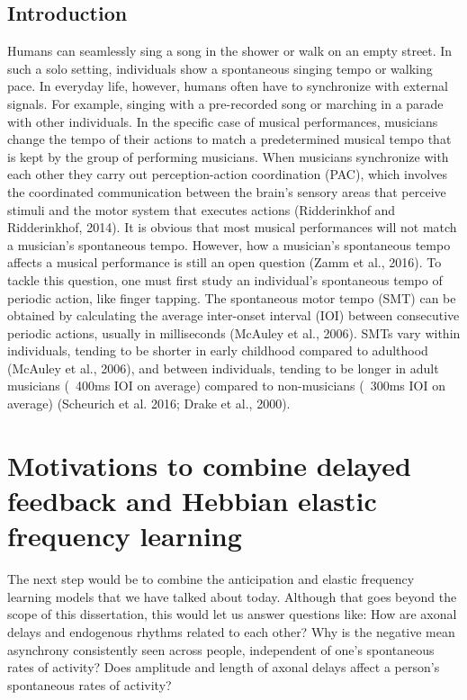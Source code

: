 \documentclass{report}
\begin{document}
\section{Introduction}
Humans can seamlessly sing a song in the shower or walk on an empty street. In such a solo setting, individuals show a spontaneous singing tempo or walking pace. In everyday life, however, humans often have to synchronize with external signals. For example, singing with a pre-recorded song or marching in a parade with other individuals. In the specific case of musical performances, musicians change the tempo of their actions to match a predetermined musical tempo that is kept by the group of performing musicians. When musicians synchronize with each other they carry out perception-action coordination (PAC), which involves the coordinated communication between the brain’s sensory areas that perceive stimuli and the motor system that executes actions (Ridderinkhof and Ridderinkhof, 2014). It is obvious that most musical performances will not match a musician's spontaneous tempo. However, how a musician's spontaneous tempo affects a musical performance is still an open question (Zamm et al., 2016). To tackle this question, one must first study an individual’s spontaneous tempo of periodic action, like finger tapping. The spontaneous motor tempo (SMT) can be obtained by calculating the average inter-onset interval (IOI) between consecutive periodic actions, usually in milliseconds (McAuley et al., 2006). SMTs vary within individuals, tending to be shorter in early childhood compared to adulthood (McAuley et al., 2006), and between individuals, tending to be longer in adult musicians (~400ms IOI on average) compared to non-musicians (~300ms IOI on average) (Scheurich et al. 2016; Drake et al., 2000).

\chapter{Motivations to combine delayed feedback and Hebbian elastic frequency learning}
The next step would be to combine the anticipation and elastic frequency learning models that we have talked about today. Although that goes beyond the scope of this dissertation, this would let us answer questions like: How are axonal delays and endogenous rhythms related to each other? Why is the negative mean asynchrony consistently seen across people, independent of one’s spontaneous rates of activity? Does amplitude and length of axonal delays affect a person’s spontaneous rates of activity?
\end{document}

